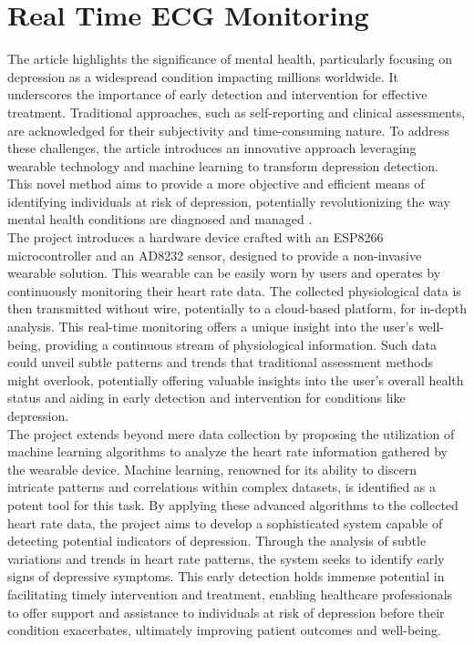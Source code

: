 \section{Real Time ECG Monitoring}
The article highlights the significance of mental health, particularly focusing on depression as a widespread condition impacting millions worldwide. It underscores the importance of early detection and intervention for effective treatment. Traditional approaches, such as self-reporting and clinical assessments, are acknowledged for their subjectivity and time-consuming nature. To address these challenges, the article introduces an innovative approach leveraging wearable technology and machine learning to transform depression detection. This novel method aims to provide a more objective and efficient means of identifying individuals at risk of depression, potentially revolutionizing the way mental health conditions are diagnosed and managed \cite{Krishnan2018iot} .
\\
The project introduces a hardware device crafted with an ESP8266 microcontroller \cite{schwartz2016internet} and an AD8232 sensor, designed to provide a non-invasive wearable solution. This wearable can be easily worn by users and operates by continuously monitoring their heart rate data. The collected physiological data is then transmitted without wire, potentially to a cloud-based platform, for in-depth analysis. This real-time monitoring offers a unique insight into the user's well-being, providing a continuous stream of physiological information. Such data could unveil subtle patterns and trends that traditional assessment methods might overlook, potentially offering valuable insights into the user's overall health status and aiding in early detection and intervention for conditions like depression.
\\
The project extends beyond mere data collection by proposing the utilization of machine learning algorithms to analyze the heart rate information gathered by the wearable device. Machine learning, renowned for its ability to discern intricate patterns and correlations within complex datasets, is identified as a potent tool for this task. By applying these advanced algorithms to the collected heart rate data, the project aims to develop a sophisticated system capable of detecting potential indicators of depression. Through the analysis of subtle variations and trends in heart rate patterns, the system seeks to identify early signs of depressive symptoms. This early detection holds immense potential in facilitating timely intervention and treatment, enabling healthcare professionals to offer support and assistance to individuals at risk of depression before their condition exacerbates, ultimately improving patient outcomes and well-being.
